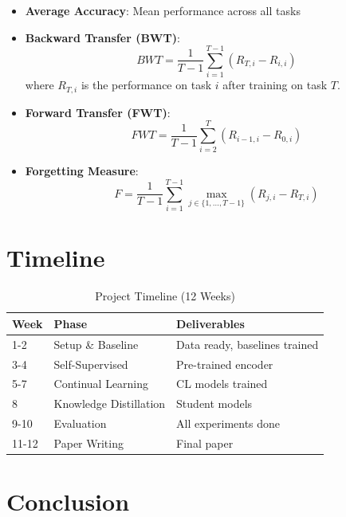 \documentclass[conference]{IEEEtran}
\begin{document}
\begin{itemize}
    \item \textbf{Average Accuracy}: Mean performance across all tasks
    
    \item \textbf{Backward Transfer (BWT)}:
    \begin{equation}
    BWT = \frac{1}{T-1} \sum_{i=1}^{T-1} (R_{T,i} - R_{i,i})
    \end{equation}
    where $R_{T,i}$ is the performance on task $i$ after training on task $T$.
    
    \item \textbf{Forward Transfer (FWT)}:
    \begin{equation}
    FWT = \frac{1}{T-1} \sum_{i=2}^{T} (R_{i-1,i} - R_{0,i})
    \end{equation}
    
    \item \textbf{Forgetting Measure}:
    \begin{equation}
    F = \frac{1}{T-1} \sum_{i=1}^{T-1} \max_{j \in \{1,\ldots,T-1\}} (R_{j,i} - R_{T,i})
    \end{equation}
\end{itemize}

\section{Timeline}

\begin{table}[h]
\centering
\caption{Project Timeline (12 Weeks)}
\begin{tabular}{|l|l|l|}
\hline
\textbf{Week} & \textbf{Phase} & \textbf{Deliverables} \\
\hline
1-2 & Setup \& Baseline & Data ready, baselines trained \\
3-4 & Self-Supervised & Pre-trained encoder \\
5-7 & Continual Learning & CL models trained \\
8 & Knowledge Distillation & Student models \\
9-10 & Evaluation & All experiments done \\
11-12 & Paper Writing & Final paper \\
\hline
\end{tabular}
\end{table}

\section{Conclusion}
\end{document}
